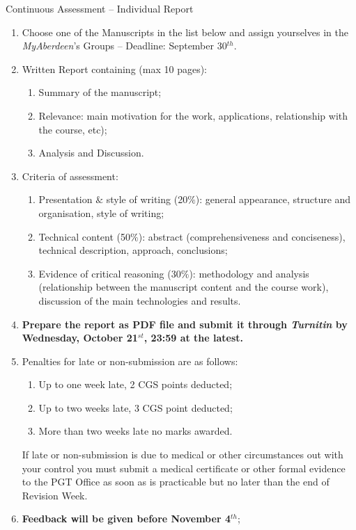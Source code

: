 \documentclass[12pts,a4paper]{report}%
\begin{document}
\begin{center}
{\Large Continuous Assessment -- Individual Report}
\end{center}

\begin{enumerate}
%
\item Choose one of the Manuscripts in the list below and assign yourselves in the {\it MyAberdeen}'s Groups -- Deadline: September 30$^{th}$.
%
\item Written Report containing (max 10 pages):
  \begin{enumerate}
   \item Summary of the manuscript;
   \item Relevance: main motivation for the work, applications, relationship with the course, etc);
   \item Analysis and Discussion.
  \end{enumerate}
%
\item Criteria of assessment:
  \begin{enumerate}
    \item Presentation $\&$ style of writing (20$\%$): general appearance, structure and organisation, style of writing;
    \item Technical content (50$\%$): abstract (comprehensiveness and conciseness), technical description, approach, conclusions;
    \item Evidence of critical reasoning (30$\%$): methodology and analysis (relationship between the manuscript content and the course work), discussion of the main technologies and results.
  \end{enumerate}
%
\item {\bf Prepare the report as PDF file and submit it through {\it Turnitin} by Wednesday, October 21$^{st}$, 23:59 at the latest.}
%
\item Penalties for late or non-submission are as follows:
\begin{enumerate}%
\item Up to one week late, 2 CGS points deducted;
\item Up to two weeks late, 3 CGS point deducted;
\item More than two weeks late no marks awarded.
\end{enumerate}
If late or non-submission is due to medical or other circumstances out with your control you must submit a medical certificate or other formal evidence to the PGT Office as soon as is practicable but no later than the end of Revision Week.
%
 \item {\bf Feedback will be given before November 4$^{th}$};
\end{enumerate}
%
\end{document}
